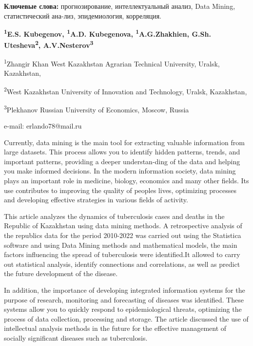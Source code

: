 {\bfseries Ключевые слова:} прогнозирование, интеллектуальный анализ, Data
Mining, статистический ана-лиз, эпидемиология, корреляция.


\begin{center}
{\bfseries \textsuperscript{1}E.S. Kubegenov\envelope,
\textsuperscript{1}A.D. Kubegenova, \textsuperscript{1}A.G.Zhakhien,
G.Sh. Utesheva\textsuperscript{2}, A.V.Nesterov\textsuperscript{3}}

\textsuperscript{1}Zhangir Khan West Kazakhstan Agrarian Technical
University, Uralsk, Kazakhstan,

\textsuperscript{2}West Kazakhstan University of Innovation and
Technology, Uralsk, Kazakhstan,

\textsuperscript{3}Plekhanov Russian University of Economics, Moscow,
Russia

e-mail: erlando78@mail.ru
\end{center}

Currently, data mining is the main tool for extracting valuable
information from large datasets. This process allows you to identify
hidden patterns, trends, and important patterns, providing a deeper
understan-ding of the data and helping you make informed decisions. In
the modern information society, data mining plays an important role in
medicine, biology, economics and many other fields. Its use contributes
to improving the quality of people\textquotesingle s lives, optimizing
processes and developing effective strategies in various fields of
activity.

This article analyzes the dynamics of tuberculosis cases and deaths in
the Republic of Kazakhstan using data mining methods. A retrospective
analysis of the republic\textquotesingle s data for the period 2010-2022
was carried out using the Statistica software and using Data Mining
methods and mathematical models, the main factors influencing the spread
of tuberculosis were identified.It allowed to carry out statistical
analysis, identify connections and correlations, as well as predict the
future development of the disease.

In addition, the importance of developing integrated information systems
for the purpose of research, monitoring and forecasting of diseases was
identified. These systems allow you to quickly respond to
epidemiological threats, optimizing the process of data collection,
processing and storage. The article discussed the use of intellectual
analysis methods in the future for the effective management of socially
significant diseases such as tuberculosis.

